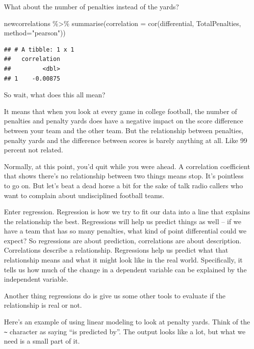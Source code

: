 \documentclass[
]{book}
\newenvironment{Shaded}{\begin{snugshade}}{\end{snugshade}}
\newcommand{\AttributeTok}[1]{\textcolor[rgb]{0.77,0.63,0.00}{#1}}
\newcommand{\FunctionTok}[1]{\textcolor[rgb]{0.00,0.00,0.00}{#1}}
\newcommand{\NormalTok}[1]{#1}
\newcommand{\SpecialCharTok}[1]{\textcolor[rgb]{0.00,0.00,0.00}{#1}}
\newcommand{\StringTok}[1]{\textcolor[rgb]{0.31,0.60,0.02}{#1}}
\begin{document}
What about the number of penalties instead of the yards?

\begin{Shaded}
\begin{Highlighting}[]
\NormalTok{newcorrelations }\SpecialCharTok{\%\textgreater{}\%} 
  \FunctionTok{summarise}\NormalTok{(}\AttributeTok{correlation =} \FunctionTok{cor}\NormalTok{(differential, TotalPenalties, }\AttributeTok{method=}\StringTok{"pearson"}\NormalTok{))}
\end{Highlighting}
\end{Shaded}

\begin{verbatim}
## # A tibble: 1 x 1
##   correlation
##         <dbl>
## 1    -0.00875
\end{verbatim}

So wait, what does this all mean?

It means that when you look at every game in college football, the number of penalties and penalty yards does have a negative impact on the score difference between your team and the other team. But the relationship between penalties, penalty yards and the difference between scores is barely anything at all. Like 99 percent not related.

Normally, at this point, you'd quit while you were ahead. A correlation coefficient that shows there's no relationship between two things means stop. It's pointless to go on. But let's beat a dead horse a bit for the sake of talk radio callers who want to complain about undisciplined football teams.

Enter regression. Regression is how we try to fit our data into a line that explains the relationship the best. Regressions will help us predict things as well -- if we have a team that has so many penalties, what kind of point differential could we expect? So regressions are about prediction, correlations are about description. Correlations describe a relationship. Regressions help us predict what that relationship means and what it might look like in the real world. Specifically, it tells us how much of the change in a dependent variable can be explained by the independent variable.

Another thing regressions do is give us some other tools to evaluate if the relationship is real or not.

Here's an example of using linear modeling to look at penalty yards. Think of the \texttt{\textasciitilde{}} character as saying ``is predicted by''. The output looks like a lot, but what we need is a small part of it.
\end{document}
